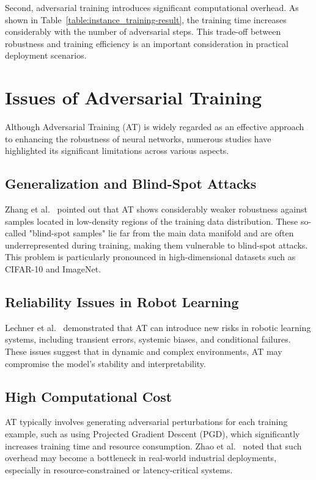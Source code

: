 \documentclass[10pt,twocolumn,letterpaper]{article}
\begin{document}
Second, adversarial training introduces significant computational overhead. As shown in Table~\ref{table:instance_training-result}, the training time increases considerably with the number of adversarial steps. This trade-off between robustness and training efficiency is an important consideration in practical deployment scenarios.

\section{Issues of Adversarial Training}
Although Adversarial Training (AT) is widely regarded as an effective approach to enhancing the robustness of neural networks, numerous studies have highlighted its significant limitations across various aspects.

\subsection{Generalization and Blind-Spot Attacks}
Zhang et al.~\cite{zhang2019limitationsadversarialtrainingblindspot} pointed out that AT shows considerably weaker robustness against samples located in low-density regions of the training data distribution. These so-called "blind-spot samples" lie far from the main data manifold and are often underrepresented during training, making them vulnerable to blind-spot attacks. This problem is particularly pronounced in high-dimensional datasets such as CIFAR-10 and ImageNet.

\subsection{Reliability Issues in Robot Learning}
Lechner et al.~\cite{lechner2021adversarialtrainingreadyrobot} demonstrated that AT can introduce new risks in robotic learning systems, including transient errors, systemic biases, and conditional failures. These issues suggest that in dynamic and complex environments, AT may compromise the model's stability and interpretability.

\subsection{High Computational Cost}
AT typically involves generating adversarial perturbations for each training example, such as using Projected Gradient Descent (PGD), which significantly increases training time and resource consumption. Zhao et al.~\cite{zhao2022review} noted that such overhead may become a bottleneck in real-world industrial deployments, especially in resource-constrained or latency-critical systems.
\end{document}
